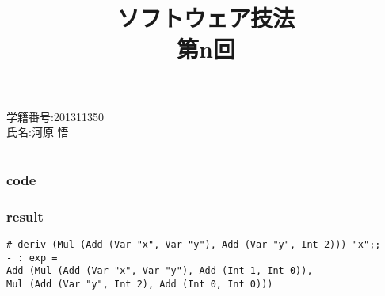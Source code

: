 \documentclass[a4j]{jsarticle}
\title{\rm ソフトウェア技法 \\ 第n回}
\author{}
\date{}
\begin{document}
\maketitle

\begin{description}
	\item[\rm \large 学籍番号:201311350]
	\item[\rm \large 氏名:河原 悟]
\end{description}

\section{}
\subsection{}
\subsubsection*{code}

\subsubsection*{result}
\begin{lstlisting}
# deriv (Mul (Add (Var "x", Var "y"), Add (Var "y", Int 2))) "x";;
- : exp =
Add (Mul (Add (Var "x", Var "y"), Add (Int 1, Int 0)),
Mul (Add (Var "y", Int 2), Add (Int 0, Int 0)))
\end{lstlisting}
\end{document}
